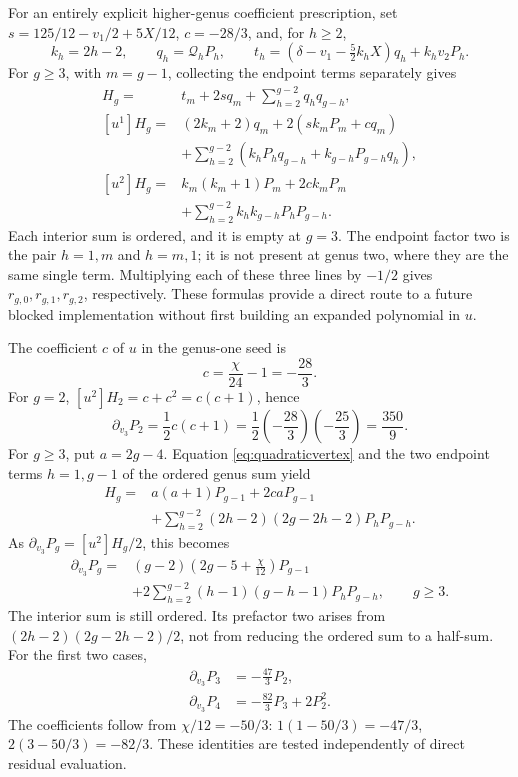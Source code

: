 \documentclass[11pt,a4paper]{article}
\numberwithin{equation}{section}
\newcommand{\del}{\partial}
\begin{document}
For an entirely explicit higher-genus coefficient prescription, set
$s=125/12-v_1/2+5X/12$, $c=-28/3$, and, for $h\ge2$,
\begin{equation}
k_h=2h-2,\qquad q_h=\mathcal Q_hP_h,\qquad
t_h=(\delta-v_1-\tfrac52k_hX)q_h+k_hv_2P_h.
\end{equation}
For $g\ge3$, with $m=g-1$, collecting the endpoint terms separately gives
\begin{align}
[u^0]H_g={}&t_m+2s q_m
             +\sum_{h=2}^{g-2}q_hq_{g-h},\\
[u^1]H_g={}&(2k_m+2)q_m+2(sk_mP_m+cq_m)\\
 &+\sum_{h=2}^{g-2}
       (k_hP_hq_{g-h}+k_{g-h}P_{g-h}q_h),\\
[u^2]H_g={}&k_m(k_m+1)P_m+2ck_mP_m\\
 &+\sum_{h=2}^{g-2}k_hk_{g-h}P_hP_{g-h}.
\end{align}
Each interior sum is ordered, and it is empty at $g=3$. The endpoint
factor two is the pair $h=1,m$ and $h=m,1$; it is not present at genus
two, where they are the same single term. Multiplying each of these three
lines by $-1/2$ gives $r_{g,0},r_{g,1},r_{g,2}$, respectively.
These formulas provide a direct route to a future blocked implementation
without first building an expanded polynomial in $u$.

The coefficient $c$ of $u$ in the genus-one seed is
\begin{equation}
c=\frac\chi{24}-1=-\frac{28}{3}.
\end{equation}
For $g=2$, $[u^2]H_2=c+c^2=c(c+1)$, hence
\begin{equation}
\del_{v_3}P_2=\frac12c(c+1)
 =\frac12\left(-\frac{28}{3}\right)\left(-\frac{25}{3}\right)
 =\frac{350}{9}.
\end{equation}
For $g\ge3$, put $a=2g-4$. Equation \eqref{eq:quadraticvertex} and
the two endpoint terms $h=1,g-1$ of the ordered genus sum yield
\begin{align}
[u^2]H_g={}&a(a+1)P_{g-1}+2caP_{g-1}\\
 &+\sum_{h=2}^{g-2}(2h-2)(2g-2h-2)P_hP_{g-h}.
\end{align}
As $\del_{v_3}P_g=[u^2]H_g/2$, this becomes
\begin{equation}\boxed{\begin{aligned}
\del_{v_3}P_g={}&(g-2)\left(2g-5+\frac\chi{12}\right)P_{g-1}\\
 &+2\sum_{h=2}^{g-2}(h-1)(g-h-1)P_hP_{g-h},\qquad g\ge3.
\end{aligned}}\label{eq:allgenusv3}
\end{equation}
The interior sum is still ordered. Its prefactor two arises from
$(2h-2)(2g-2h-2)/2$, not from reducing the ordered sum to a half-sum.
For the first two cases,
\begin{align}
\del_{v_3}P_3&=-\frac{47}{3}P_2,\\
\del_{v_3}P_4&=-\frac{82}{3}P_3+2P_2^2.
\end{align}
The coefficients follow from $\chi/12=-50/3$:
$1(1-50/3)=-47/3$, $2(3-50/3)=-82/3$.
These identities are tested independently of direct residual evaluation.
\end{document}
